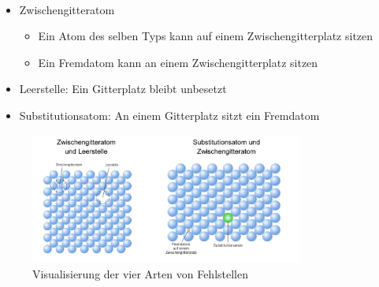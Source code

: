 \documentclass[11pt,a4paper]{article}
\numberwithin{equation}{section}
\numberwithin{figure}{section}
\begin{document}
\\
\begin{addmargin}[25pt]{0pt}    
\begin{itemize}
    \item Zwischengitteratom
    \begin{itemize}
        \item Ein Atom des selben Typs kann auf einem Zwischengitterplatz sitzen
        \item Ein Fremdatom kann an einem Zwischengitterplatz sitzen
    \end{itemize}
    \item Leerstelle: Ein Gitterplatz bleibt unbesetzt
    \item Substitutionsatom: An einem Gitterplatz sitzt ein Fremdatom
\end{itemize}
\begin{figure}[h]
    \centering
    \includegraphics[width = 0.8\textwidth]{images/Materialwissenschaften/Fehlstellen.jpeg}
    \caption{Visualisierung der vier Arten von Fehlstellen}
    \label{fig:Fehlstellen}
\end{figure}
\end{addmargin}
\end{document}
